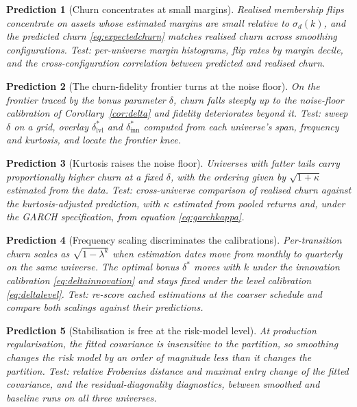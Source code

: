 \documentclass[11pt]{article}
\newtheorem{prediction}{Prediction}
\theoremstyle{remark}
\begin{document}
\begin{prediction}[Churn concentrates at small margins]
\label{pred:margins}
Realised membership flips concentrate on assets whose estimated margins are
small relative to $\sigma_d(k)$, and the predicted churn
\eqref{eq:expectedchurn} matches realised churn across smoothing
configurations. Test: per-universe margin histograms, flip rates by margin
decile, and the cross-configuration correlation between predicted and realised
churn.
\end{prediction}

\begin{prediction}[The churn-fidelity frontier turns at the noise floor]
\label{pred:knee}
On the frontier traced by the bonus parameter $\delta$, churn falls steeply up
to the noise-floor calibration of Corollary~\ref{cor:delta} and fidelity
deteriorates beyond it. Test: sweep $\delta$ on a grid, overlay
$\delta^{*}_{\mathrm{lvl}}$ and $\delta^{*}_{\mathrm{inn}}$ computed from each
universe's span, frequency and kurtosis, and locate the frontier knee.
\end{prediction}

\begin{prediction}[Kurtosis raises the noise floor]
\label{pred:kurtosis}
Universes with fatter tails carry proportionally higher churn at a fixed
$\delta$, with the ordering given by $\sqrt{1+\kappa}$ estimated from the
data. Test: cross-universe comparison of realised churn against the
kurtosis-adjusted prediction, with $\kappa$ estimated from pooled returns and,
under the GARCH specification, from equation \eqref{eq:garchkappa}.
\end{prediction}

\begin{prediction}[Frequency scaling discriminates the calibrations]
\label{pred:frequency}
Per-transition churn scales as $\sqrt{1-\lambda^{k}}$ when estimation dates
move from monthly to quarterly on the same universe. The optimal bonus
$\delta^{*}$ moves with $k$ under the innovation calibration
\eqref{eq:deltainnovation} and stays fixed under the level calibration
\eqref{eq:deltalevel}. Test: re-score cached estimations at the coarser
schedule and compare both scalings against their predictions.
\end{prediction}

\begin{prediction}[Stabilisation is free at the risk-model level]
\label{pred:invariance}
At production regularisation, the fitted covariance is insensitive to the
partition, so smoothing changes the risk model by an order of magnitude less
than it changes the partition. Test: relative Frobenius distance and maximal
entry change of the fitted covariance, and the residual-diagonality
diagnostics, between smoothed and baseline runs on all three universes.
\end{prediction}
\end{document}
